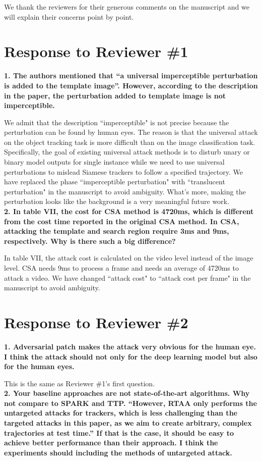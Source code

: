 \documentclass{article}
\begin{document}
\noindent We thank the reviewers for their generous comments on the manuscript and we will explain their concerns point by point.

\section*{Response to Reviewer \#1}

\textbf{1. The authors mentioned that “a universal imperceptible perturbation is added to the template image”. However, according to the description in the paper, the perturbation added to template image is not imperceptible.}

We admit that the description “imperceptible" is not precise because the perturbation can be found by human eyes. The reason is that the universal attack on the object tracking task is more difficult than on the image classification task. Specifically, the goal of existing universal attack methods is to disturb unary or binary model outputs for single instance while we need to use universal perturbations to mislead Siamese trackers to follow a specified trajectory. 
We have replaced the phase ``imperceptible perturbation" with ``translucent perturbation" \cite{zolfi2021translucent} in the manuscript to avoid ambiguity.
What's more, making the perturbation looks like the background is a very meaningful future work.
\\[6pt]
\noindent \textbf{2. In table VII, the cost for CSA method is 4720ms, which is different from the cost time reported in the original CSA method. In CSA, attacking the template and search region require 3ms and 9ms, respectively. Why is there such a big difference?}

In table VII, the attack cost is calculated on the video level instead of the image level. CSA needs 9ms to process a frame and needs an average of 4720ms to attack a video. We have changed ``attack cost" to ``attack cost per frame" in the manuscript to avoid ambiguity.

\section*{Response to Reviewer \#2}
\textbf{1. Adversarial patch makes the attack very obvious for the human eye. I think the attack should not only for the deep learning model but also for the human eyes.}

This is the same as Reviewer \#1's first question.
\\[6pt]
\noindent \textbf{2. Your baseline approaches are not state-of-the-art algorithms. Why not compare to SPARK and TTP. “However, RTAA only performs the untargeted attacks for trackers, which is less challenging than the targeted attacks in this paper, as we aim to create arbitrary, complex trajectories at test time.” If that is the case, it should be easy to achieve better performance than their approach. I think the experiments should including the methods of untargeted attack.}
\end{document}
